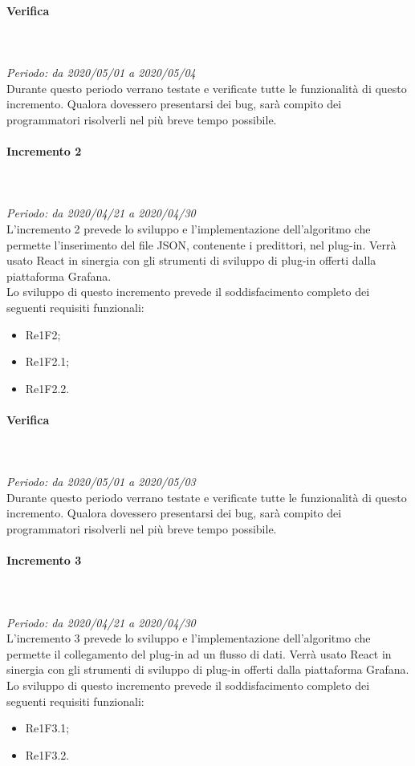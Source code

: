 \paragraph*{Verifica}\mbox{} \\ \mbox{} \\ 
\textit{Periodo: da 2020/05/01 a 2020/05/04}\\
Durante questo periodo verrano testate e verificate tutte le funzionalità di questo incremento. Qualora dovessero presentarsi dei bug, sarà compito dei programmatori risolverli nel più breve tempo possibile.

\paragraph{Incremento 2}\mbox{} \\ \mbox{} \\ 
\textit{Periodo: da 2020/04/21 a 2020/04/30}\\
L’incremento 2 prevede lo sviluppo e l’implementazione dell'algoritmo che permette l'inserimento del file JSON, contenente i predittori, nel plug-in. Verrà usato React in sinergia con gli strumenti di sviluppo di plug-in offerti dalla piattaforma Grafana. \\
Lo sviluppo di questo incremento prevede il soddisfacimento completo dei seguenti requisiti funzionali:
\begin{itemize}
\item Re1F2;
\item Re1F2.1;
\item Re1F2.2.
\end{itemize}
\paragraph*{Verifica}\mbox{} \\ \mbox{} \\ 
\textit{Periodo: da 2020/05/01 a 2020/05/03}\\
Durante questo periodo verrano testate e verificate tutte le funzionalità di questo incremento. Qualora dovessero presentarsi dei bug, sarà compito dei programmatori risolverli nel più breve tempo possibile.

\paragraph{Incremento 3}\mbox{} \\ \mbox{} \\ 
\textit{Periodo: da 2020/04/21 a 2020/04/30}\\
L’incremento 3 prevede lo sviluppo e l’implementazione dell'algoritmo che permette il collegamento del plug-in ad un flusso di dati. Verrà usato React in sinergia con gli strumenti di sviluppo di plug-in offerti dalla piattaforma Grafana. \\
Lo sviluppo di questo incremento prevede il soddisfacimento completo dei seguenti requisiti funzionali:
\begin{itemize}
\item Re1F3.1;
\item Re1F3.2.
\end{itemize}
